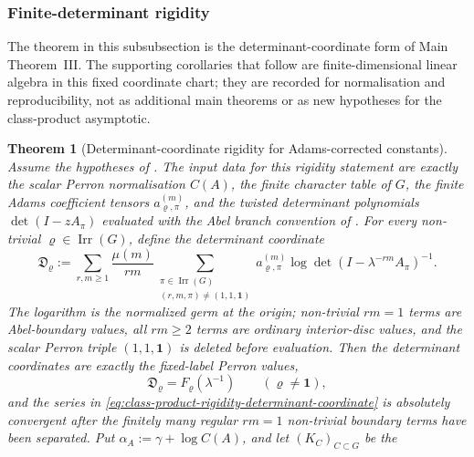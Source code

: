 \documentclass[11pt,a4paper]{amsart}
\theoremstyle{plain}
\newtheorem{theorem}{Theorem}[section]
\theoremstyle{definition}
\theoremstyle{remark}
\DeclareMathOperator{\Irr}{Irr}
\begin{document}
\subsubsection{Finite-determinant rigidity}

The theorem in this subsubsection is the determinant-coordinate form of Main
Theorem~III.  The supporting corollaries that follow are finite-dimensional
linear algebra in this fixed coordinate chart; they are recorded for
normalisation and reproducibility, not as additional main theorems or as new
hypotheses for the class-product asymptotic.

\begin{theorem}[Determinant-coordinate rigidity for Adams-corrected constants]
  \label{thm:class-product-determinant-rigidity}
  Assume the hypotheses of .  The input
  data for this rigidity statement are exactly the scalar Perron
  normalisation \(C(A)\), the finite character table of \(G\), the finite
  Adams coefficient tensors \(a_{\varrho,\pi}^{(m)}\), and the twisted
  determinant polynomials \(\det(I-zA_\pi)\) evaluated with the Abel branch
  convention of .  For every
  non-trivial \(\varrho\in\Irr(G)\), define the determinant coordinate
  \begin{equation}\label{eq:class-product-rigidity-determinant-coordinate}
    \mathfrak D_\varrho:=
    \sum_{r,m\ge1}\frac{\mu(m)}{rm}
      \sum_{\substack{\pi\in\Irr(G)\\(r,m,\pi)\neq(1,1,\mathbf1)}}
        a_{\varrho,\pi}^{(m)}
        \log\det(I-\lambda^{-rm}A_\pi)^{-1}.
  \end{equation}
  The logarithm is the normalized germ at the origin; non-trivial
  \(rm=1\) terms are Abel-boundary values, all \(rm\ge2\) terms are ordinary
  interior-disc values, and the scalar Perron triple
  \((1,1,\mathbf1)\) is deleted before evaluation.  Then the determinant
  coordinates are exactly the fixed-label Perron values,
  \begin{equation}\label{eq:class-product-rigidity-d-equals-f}
    \mathfrak D_\varrho=F_\varrho(\lambda^{-1})
    \qquad(\varrho\ne\mathbf1),
  \end{equation}
  and the series in
  \eqref{eq:class-product-rigidity-determinant-coordinate} is absolutely
  convergent after the finitely many regular \(rm=1\) non-trivial boundary
  terms have been separated.  Put
  \(\alpha_A:=\gamma+\log C(A)\), and let \((K_C)_{C\subset G}\) be the

\end{theorem}
\end{document}

